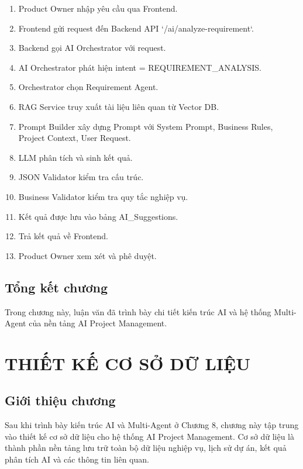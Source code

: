 \documentclass[12pt,a4paper]{report}
\begin{document}
\begin{enumerate}
\item Product Owner nhập yêu cầu qua Frontend.
\item Frontend gửi request đến Backend API `/ai/analyze-requirement`.
\item Backend gọi AI Orchestrator với request.
\item AI Orchestrator phát hiện intent = REQUIREMENT\_ANALYSIS.
\item Orchestrator chọn Requirement Agent.
\item RAG Service truy xuất tài liệu liên quan từ Vector DB.
\item Prompt Builder xây dựng Prompt với System Prompt, Business Rules, Project Context, User Request.
\item LLM phân tích và sinh kết quả.
\item JSON Validator kiểm tra cấu trúc.
\item Business Validator kiểm tra quy tắc nghiệp vụ.
\item Kết quả được lưu vào bảng AI\_Suggestions.
\item Trả kết quả về Frontend.
\item Product Owner xem xét và phê duyệt.
\end{enumerate}

\section{Tổng kết chương}


Trong chương này, luận văn đã trình bày chi tiết kiến trúc AI và hệ thống Multi-Agent của nền tảng AI Project Management.

\chapter{THIẾT KẾ CƠ SỞ DỮ LIỆU}
\label{chap:database_design}

\section{Giới thiệu chương}

Sau khi trình bày kiến trúc AI và Multi-Agent ở Chương 8, chương này tập trung vào thiết kế cơ sở dữ liệu cho hệ thống AI Project Management. Cơ sở dữ liệu là thành phần nền tảng lưu trữ toàn bộ dữ liệu nghiệp vụ, lịch sử dự án, kết quả phân tích AI và các thông tin liên quan.
\end{document}
